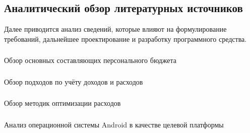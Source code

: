 \subsection{Аналитический обзор литературных источников}
\label{sec:analysis:literature}

Далее приводится анализ сведений, которые влияют на формулирование требований, дальнейшее проектирование и разработку программного средства.

\subsubsection{} Обзор основных составляющих персонального бюджета
\label{sec:analysis:literature:components}


\subsubsection{} Обзор подходов по учёту доходов и расходов
\label{sec:analysis:literature:tracking}


\subsubsection{} Обзор методик оптимизации расходов
\label{sec:analysis:literature:optimization}


\subsubsection{} Анализ операционной системы Android в качестве целевой платформы
\label{sec:analysis:literature:android}

